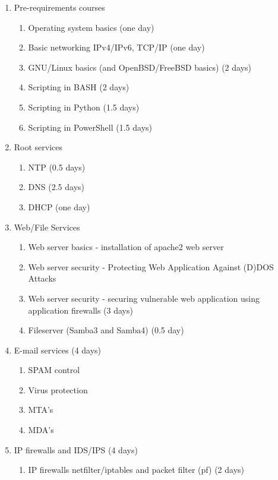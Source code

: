 \begin{enumerate}[label=Hands-on block \arabic*.,leftmargin=*]
  \item Pre-requirements courses
    \begin{enumerate}[label=LAB \arabic*.,leftmargin=*]
  	\item Operating system basics (one day)
  	\item Basic networking IPv4/IPv6, TCP/IP (one day)
  	\item GNU/Linux basics (and OpenBSD/FreeBSD basics) (2 days)
  	\item Scripting in BASH (2 days)
  	\item Scripting in Python (1.5 days)
  	\item Scripting in PowerShell (1.5 days)
  \end{enumerate}
  \item Root services
  \begin{enumerate}[label=LAB \arabic*.,leftmargin=*]
  	\item NTP (0.5 days)
  	\item DNS (2.5 days)
  	\item DHCP (one day)
  \end{enumerate}
  \item Web/File Services
    \begin{enumerate}[label=LAB \arabic*.,leftmargin=*]
    \item Web server basics - installation of apache2 web server
  	\item Web server security - Protecting Web Application Against
(D)DOS Attacks
  	\item Web server security - securing vulnerable web application using application firewalls (3 days)
  	\item Fileserver (Samba3 and Samba4) (0.5 day)
  \end{enumerate}
    \item E-mail services (4 days)
    \begin{enumerate}[label=LAB \arabic*.,leftmargin=*]
  		\item SPAM control
	  	\item Virus protection
  		\item MTA's 
	  	\item MDA's
    \end{enumerate}
    \item IP firewalls and IDS/IPS (4 days)
        \begin{enumerate}[label=LAB \arabic*.,leftmargin=*]
  		\item IP firewalls netfilter/iptables and packet filter (pf) (2 days)

\end{enumerate}
\end{enumerate}
